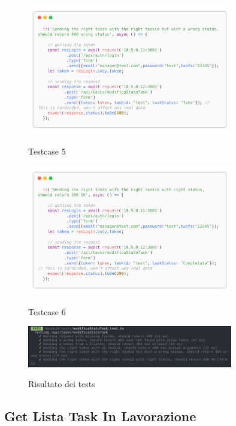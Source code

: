 \documentclass{report}
\begin{document}
\begin{figure}[H]
	\centering\includegraphics[width=0.8\textwidth]{images/code_modifica_stato_test5.png}
	
	Testcase 5
\end{figure}
\begin{figure}[H]
	\centering\includegraphics[width=0.8\textwidth]{images/code_modifica_stato_test6.png}
	
	Testcase 6
\end{figure}

\begin{figure}[H]
	\centering\includegraphics[width=0.8\textwidth]{images/jest_modifica_stato.png}
	
	Risultato dei tests
\end{figure}

\subsection{Get Lista Task In Lavorazione}
\end{document}
